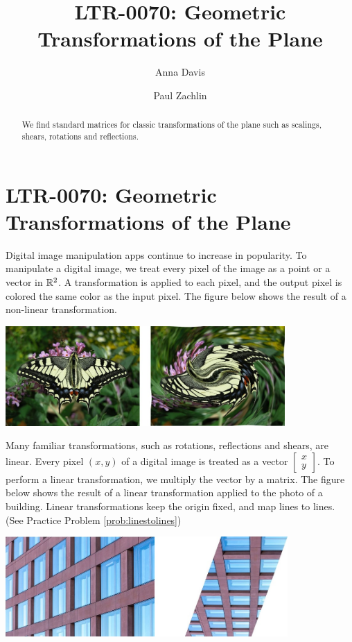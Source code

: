 \documentclass{ximera}
\author{Anna Davis \and Paul Zachlin} \title{LTR-0070: Geometric Transformations of the Plane} \license{CC-BY 4.0}
\begin{document}
\begin{abstract}
  We find standard matrices for classic transformations of the plane such as scalings, shears, rotations and reflections.
\end{abstract}
\maketitle

\section*{LTR-0070: Geometric Transformations of the Plane}
Digital image manipulation apps continue to increase in popularity.  To manipulate a digital image, we treat every pixel of the image as a point or a vector in $\mathbb{R}^2$.  A transformation is applied to each pixel, and the output pixel is colored the same color as the input pixel.  The figure below shows the result of a non-linear transformation.

\begin{image}
   
\includegraphics[height=1.5in]{twobutterflies.jpg}~
 
\end{image}

Many familiar transformations, such as rotations, reflections and shears, are linear. Every pixel $(x, y)$ of a digital image is treated as a vector $\begin{bmatrix}
x\\
y
\end{bmatrix}$.  To perform a linear transformation, we multiply the vector by a matrix.  The figure below shows the result of a linear transformation applied to the photo of a building.  Linear transformations keep the origin fixed, and map lines to lines. (See Practice Problem \ref{prob:linestolines})  


    \begin{image}
         \includegraphics[height=1.5in]{twobuildings.jpg}
\end{image}
\end{document}
